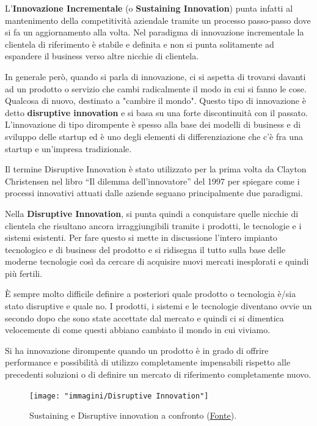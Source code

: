 L'\textbf{Innovazione Incrementale} (o \textbf{Sustaining Innovation}) punta infatti al mantenimento della competitività aziendale tramite un processo
passo-passo dove si fa un aggiornamento alla volta. Nel paradigma di innovazione incrementale la clientela di riferimento è stabile e definita e non
si punta solitamente ad espandere il business verso altre nicchie di clientela.

In generale però, quando si parla di innovazione, ci si aspetta di trovarsi davanti ad un prodotto o servizio che cambi radicalmente il modo in cui si
fanno le cose. Qualcosa di nuovo, destinato a "cambire il mondo". Questo tipo di innovazione è detto \textbf{disruptive innovation} e si basa su una
forte discontinuità con il passato. L'innovazione di tipo dirompente è spesso alla base dei modelli di business e di sviluppo delle startup ed è uno
degli elementi di differenziazione che c'è fra una startup e un'impresa tradizionale.

Il termine Disruptive Innovation è stato utilizzato per la prima volta da Clayton Christensen nel libro ``Il dilemma dell’innovatore'' del 1997 per
spiegare come i processi innovativi attuati dalle aziende seguano principalmente due paradigmi.

Nella \textbf{Disruptive Innovation}, si punta quindi a conquistare quelle nicchie di clientela che risultano ancora irraggiungibili tramite i
prodotti, le tecnologie e i sistemi esistenti. Per fare questo si mette in discussione l'intero impianto tecnologico e di business del prodotto e si
ridisegna il tutto sulla base delle moderne tecnologie così da cercare di acquisire nuovi mercati inesplorati e quindi più fertili.

\`E sempre molto difficile definire a posteriori quale prodotto o tecnologia è/sia stato disruptive e quale no. I prodotti, i sistemi e le tecnologie
diventano ovvie un secondo dopo che sono state accettate dal mercato e quindi ci si dimentica velocemente di come questi abbiano cambiato il mondo in
cui viviamo. 

Si ha innovazione dirompente quando un prodotto è in grado di offrire performance e possibilità di utilizzo completamente impensabili rispetto alle
precedenti soluzioni o di definire un mercato di riferimento completamente nuovo.

\begin{figure}[!h]
	\centering
	\texttt{[image: "immagini/Disruptive Innovation"]}
	\caption{Sustaining e Disruptive innovation a confronto
		(\href{https://hcldr.wordpress.com/2017/01/10/disruptive-innovation-in-healthcare/}{\underline{Fonte}}).}
\end{figure}

